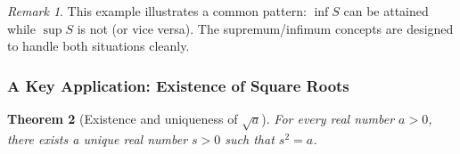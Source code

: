 \documentclass[12pt]{article}
\numberwithin{equation}{section}
\theoremstyle{plain}
\newtheorem{theorem}{Theorem}[section]
\theoremstyle{definition}
\theoremstyle{remark}
\newtheorem{remark}[theorem]{Remark}
\begin{document}
\begin{remark}
This example illustrates a common pattern: $\inf S$ can be attained while $\sup S$ is not (or vice versa). The supremum/infimum concepts are designed to handle both situations cleanly.
\end{remark}

\subsubsection{A Key Application: Existence of Square Roots}

\begin{theorem}[Existence and uniqueness of $\sqrt{a}$]\label{thm:sqrt-exists}
For every real number $a>0$, there exists a unique real number $s>0$ such that $s^2=a$.
\end{theorem}
\end{document}
